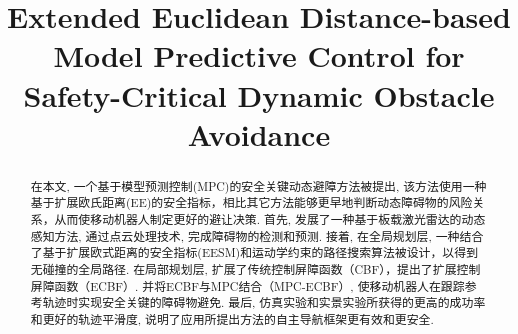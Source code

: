 \documentclass[preprint,5p,times,twocolumn]{elsarticle}
\begin{document}
\begin{frontmatter}



\title{Extended Euclidean Distance-based Model Predictive Control for Safety-Critical Dynamic Obstacle Avoidance
}






\begin{abstract}
在本文, 一个基于模型预测控制(MPC)的安全关键动态避障方法被提出, 该方法使用一种基于扩展欧氏距离(EE)的安全指标，相比其它方法能够更早地判断动态障碍物的风险关系，从而使移动机器人制定更好的避让决策. 
首先, 发展了一种基于板载激光雷达的动态感知方法, 通过点云处理技术, 完成障碍物的检测和预测.
接着, 在全局规划层, 一种结合了基于扩展欧式距离的安全指标(EESM)和运动学约束的路径搜索算法被设计，以得到无碰撞的全局路径.
在局部规划层, 扩展了传统控制屏障函数（CBF），提出了扩展控制屏障函数（ECBF）. 并将ECBF与MPC结合（MPC-ECBF）, 使移动机器人在跟踪参考轨迹时实现安全关键的障碍物避免.
最后, 仿真实验和实景实验所获得的更高的成功率和更好的轨迹平滑度, 说明了应用所提出方法的自主导航框架更有效和更安全.


\end{abstract}
\end{frontmatter}
\end{document}
